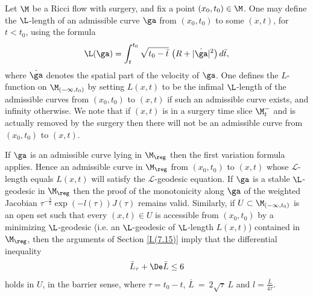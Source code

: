 Let $\M$ be a Ricci flow with surgery,
and fix a point $(x_0,t_0)\in\M$.   One may
define the $\L$-length of an  admissible curve $\ga$ from
$(x_0,t_0)$ to some $(x,t)$, for $t<t_0$, using the formula
\begin{equation}
\L(\ga)=\int_t^{t_0}\sqrt{t_0-\bar t}\,\left(R+|\dot{\ga}|^2\right)d\bar t,
\end{equation}
where $\dot{\ga}$ denotes the spatial part of the velocity of $\ga$.
One defines the $L$-function on $\M_{(-\infty, t_0)}$ by setting
$L(x,t)$ to be the infimal $\L$-length of the admissible curves
from $(x_0,t_0)$ to $(x,t)$ if such an admissible curve exists, and
infinity otherwise. We note that if $(x,t)$ is in a surgery time slice
$\M_t^-$ and is actually removed by the surgery then there will not be an
admissible curve from $(x_0, t_0)$ to $(x,t)$.

If $\ga$ is an admissible curve lying in $\M_{\reg}$ then
the first variation formula applies.
Hence an admissible curve in $\M_{\reg}$ from $(x_0, t_0)$ to $(x,t)$
whose ${\mathcal L}$-length
equals $L(x,t)$ will satisfy the ${\mathcal L}$-geodesic
equation.
If $\ga$ is a stable $\L$-geodesic in $\M_{\reg}$ then
the proof of the monotonicity along $\ga$ of
the weighted Jacobian
$\tau^{-\frac{3}{2}}\exp(-l(\tau))J(\tau)$ remains valid.
Similarly, if $U\subset \M_{(-\infty,t_0)}$ is an open set such that
every $(x, t)\in U$ is accessible from $(x_0,t_0)$
by a minimizing $\L$-geodesic (i.e. an $\L$-geodesic of $\L$-length
$L(x,t)$) contained in $\M_{\reg}$,
then the arguments of Section \ref{I.(7.15)} imply that the
differential inequality
\begin{equation} \label{newbarrier}
\bar L_\tau+\De \bar L\leq 6
\end{equation}
holds in $U$, in the barrier sense, where $\tau = t_0 - t$,
$\bar L \: = \: 2 \sqrt{\tau} \: L$ and
$l = \frac{\bar L}{4\tau}$.

